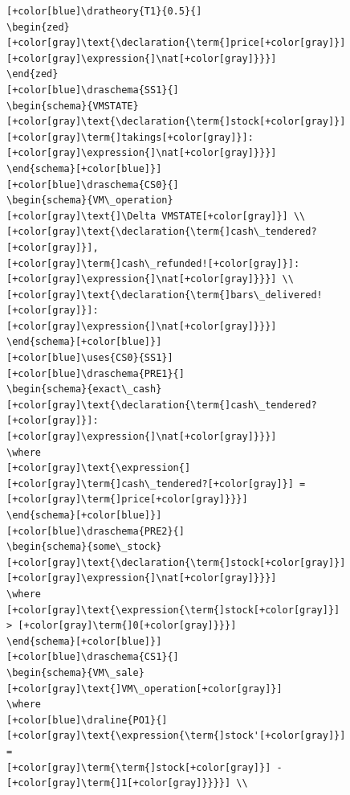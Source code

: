\begin{figure}[H]
\vspace{-0.2in}
\centering
\begin{minipage}{0.45\textwidth}
\centering
\begin{tiny}
\begin{BVerbatim}[commandchars=+\[\]]
[+color[blue]\dratheory{T1}{0.5}{]
\begin{zed}
[+color[gray]\text{\declaration{\term{]price[+color[gray]}]: [+color[gray]\expression{]\nat[+color[gray]}}}]
\end{zed}
[+color[blue]\draschema{SS1}{]
\begin{schema}{VMSTATE}
[+color[gray]\text{\declaration{\term{]stock[+color[gray]}],
[+color[gray]\term{]takings[+color[gray]}]: [+color[gray]\expression{]\nat[+color[gray]}}}]
\end{schema}[+color[blue]}]
[+color[blue]\draschema{CS0}{]
\begin{schema}{VM\_operation}
[+color[gray]\text{]\Delta VMSTATE[+color[gray]}] \\
[+color[gray]\text{\declaration{\term{]cash\_tendered?[+color[gray]}], 
[+color[gray]\term{]cash\_refunded![+color[gray]}]: [+color[gray]\expression{]\nat[+color[gray]}}}] \\
[+color[gray]\text{\declaration{\term{]bars\_delivered![+color[gray]}]:
[+color[gray]\expression{]\nat[+color[gray]}}}]
\end{schema}[+color[blue]}]
[+color[blue]\uses{CS0}{SS1}]
[+color[blue]\draschema{PRE1}{]
\begin{schema}{exact\_cash}
[+color[gray]\text{\declaration{\term{]cash\_tendered?[+color[gray]}]:
[+color[gray]\expression{]\nat[+color[gray]}}}]
\where
[+color[gray]\text{\expression{]
[+color[gray]\term{]cash\_tendered?[+color[gray]}] = [+color[gray]\term{]price[+color[gray]}}}]
\end{schema}[+color[blue]}]
[+color[blue]\draschema{PRE2}{]
\begin{schema}{some\_stock}
[+color[gray]\text{\declaration{\term{]stock[+color[gray]}]: [+color[gray]\expression{]\nat[+color[gray]}}}]
\where
[+color[gray]\text{\expression{\term{]stock[+color[gray]}] > [+color[gray]\term{]0[+color[gray]}}}]
\end{schema}[+color[blue]}]
[+color[blue]\draschema{CS1}{]
\begin{schema}{VM\_sale}
[+color[gray]\text{]VM\_operation[+color[gray]}]
\where
[+color[blue]\draline{PO1}{]
[+color[gray]\text{\expression{\term{]stock'[+color[gray]}] =
[+color[gray]\term{\term{]stock[+color[gray]}] - [+color[gray]\term{]1[+color[gray]}}}}] \\

\end{BVerbatim}
\end{tiny}
\end{minipage}
\end{figure}
